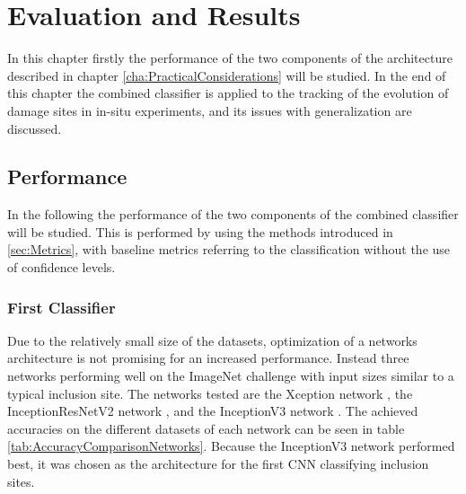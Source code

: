
\chapter{Evaluation and Results} %

\label{Performance} %

In this chapter firstly the performance of the two components of the architecture described in chapter \ref{cha:PracticalConsiderations} will be studied. In the end of this chapter the combined classifier is applied to the tracking of the evolution of damage sites in in-situ experiments, and its issues with generalization are discussed.

\section{Performance}
In the following the performance of the two components of the combined classifier will be studied. This is performed by using the methods introduced in \ref{sec:Metrics}, with baseline metrics referring to the classification without the use of confidence levels.

\subsection{First Classifier}

Due to the relatively small size of the datasets, optimization of a networks architecture is not promising for an increased performance. Instead three networks performing well on the ImageNet challenge \cite{imagenet_cvpr09} with input sizes similar to a typical inclusion site. The networks tested are the Xception network \cite{Xception}, the InceptionResNetV2 network \cite{InceptionResNetV2}, and the InceptionV3 network \cite{inception}. The achieved accuracies on the different datasets of each network can be seen in table \ref{tab:AccuracyComparisonNetworks}. Because the InceptionV3 network performed best, it was chosen as the architecture for the first CNN classifying inclusion sites. \\



